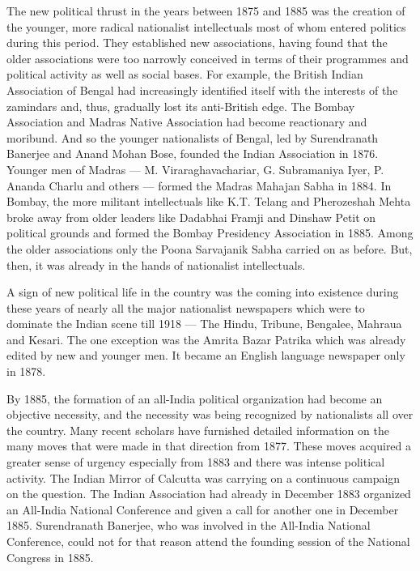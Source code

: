 The new political thrust in the years between 1875 and 1885 was the creation of the younger, more radical nationalist intellectuals most of whom entered politics during this period. They established new associations, having found that the older associations were too narrowly conceived in terms of their programmes and political activity as well as social bases. For example, the British Indian Association of Bengal had increasingly identified itself with the interests of the zamindars and, thus, gradually lost its anti-British edge. The Bombay Association and Madras Native Association had become reactionary and moribund. And so the younger nationalists of Bengal, led by Surendranath Banerjee and Anand Mohan Bose, founded the Indian Association in 1876. Younger men of Madras --- M. Viraraghavachariar, G. Subramaniya Iyer, P. Ananda Charlu and others --- formed the Madras Mahajan Sabha in 1884. In Bombay, the more militant intellectuals like K.T. Telang and Pherozeshah Mehta broke away from older leaders like Dadabhai Framji and Dinshaw Petit on political grounds and formed the Bombay Presidency Association in 1885. Among the older associations only the Poona Sarvajanik Sabha carried on as before. But, then, it was already in the hands of nationalist intellectuals.

A sign of new political life in the country was the coming into existence during these years of nearly all the major nationalist newspapers which were to dominate the Indian scene till 1918 --- The Hindu, Tribune, Bengalee, Mahraua and Kesari. The one exception was the Amrita Bazar Patrika which was already edited by new and younger men. It became an English language newspaper only in 1878.

By 1885, the formation of an all-India political organization had become an objective necessity, and the necessity was being recognized by nationalists all over the country. Many recent scholars have furnished detailed information on the many moves that were made in that direction from 1877. These moves acquired a greater sense of urgency especially from 1883 and there was intense political activity. The Indian Mirror of Calcutta was carrying on a continuous campaign on the question. The Indian Association had already in December 1883 organized an All-India National Conference and given a call for another one in December 1885. Surendranath Banerjee, who was involved in the All-India National Conference, could not for that reason attend the founding session of the National Congress in 1885.

